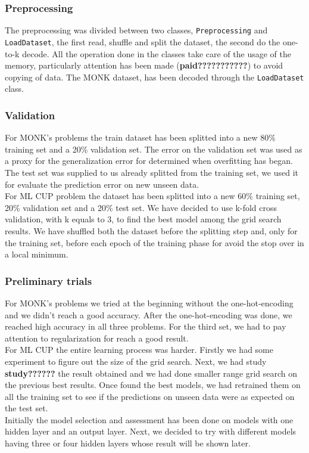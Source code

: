 \subsubsection{Preprocessing}
The preprocessing was divided between two classes, \texttt{Preprocessing} and \texttt{LoadDataset}, the first read, shuffle and split the dataset, the second do the one-to-k decode. All the operation done in the classes take care of the usage of the memory, particularly attention has been made (\textbf{paid???????????}) to avoid copying of data. The MONK dataset, has been decoded through the \texttt{LoadDataset} class.

\subsubsection{Validation}
For MONK's problems the train dataset has been splitted into a new 80\% training set and a 20\% validation set. The error on the validation set was used as a proxy for the generalization error for determined when overfitting has began. The test set was supplied to us already splitted from the training set, we used it for evaluate the prediction error on new unseen data. 
\\
For ML CUP problem the dataset has been splitted into a new 60\% training set, 20\% validation set and a 20\% test set. We have decided to use k-fold cross validation, with k equals to 3, to find the best model among the grid search results. 
We have shuffled both the dataset before the splitting step and, only for the training set, before each epoch of the training phase for avoid the stop over in a local minimum. 


\subsubsection{Preliminary trials}

For MONK's problems we tried at the beginning without the one-hot-encoding and we didn't reach a good accuracy. After the one-hot-encoding was done, we reached high accuracy in all three problems. For the third set, we had to pay attention to regularization for reach a good result.
\\
For ML CUP the entire learning process was harder. Firstly we had some experiment to figure out the size of the grid search. Next, we had study \textbf{study??????} the result obtained and we had done smaller range grid search on the previous best results. Once found the best models, we had retrained them on all the training set to see if the predictions on unseen data were as expected on the test set. 
\\
Initially the model selection and assessment has been done on models with one hidden layer and an output layer. Next, we decided to try with different models having three or four hidden layers whose result will be shown later.
